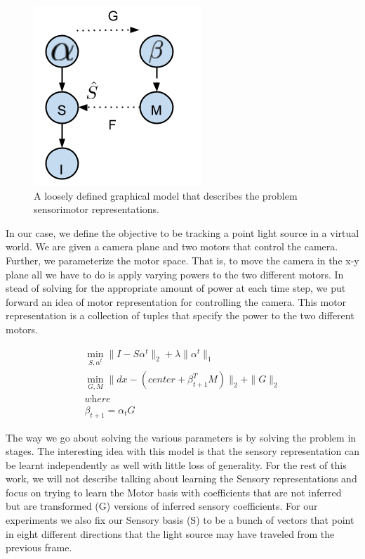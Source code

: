 \documentclass[conference]{IEEEtran}
\begin{document}
\begin{figure}
\includegraphics[scale=0.6]{sesemo1.png}
\caption{A loosely defined graphical model that describes the problem sensorimotor representations. }
\end{figure}

In our case, we define the objective to be tracking a point light source in a virtual world. We are given a camera plane and two motors that control the camera. Further, we parameterize the motor space. That is, to move the camera in the x-y plane all we have to do is apply varying powers to the two different motors. In stead of solving for the appropriate amount of power at each time step, we put forward an idea of motor representation for controlling the camera. This motor representation is a collection of tuples that specify the power to the two different motors. 

\begin{eqnarray}
\min_{S,\alpha^{t}} \| I - S\alpha^{t} \|_{2} + \lambda \| \alpha^{t} \|_{1}\\
\min_{G,M}  \| dx - (center + \beta_{t+1}^{T}M ) \|_{2} + \|G \|_{2}\\
\textit{where}\\
\beta_{t+1} = \alpha_{t} G
\end{eqnarray}

The way we go about solving the various parameters is by solving the problem in stages. The interesting idea with this model is that the sensory representation can be learnt independently as well with little loss of generality. For the rest of this work, we will not describe talking about learning the Sensory representations and focus on trying to learn the Motor basis with coefficients that are not inferred but are transformed (G) versions of inferred sensory coefficients. For our experiments we also fix our Sensory basis (S) to be a bunch of vectors that point in eight different directions that the light source may have traveled from the previous frame.
\end{document}

